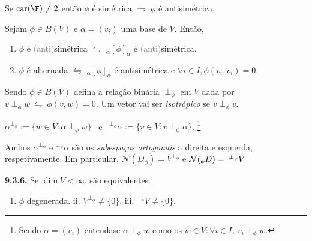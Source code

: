 \begin{note}
    Se \(\operatorname{car}(\F) \neq 2\) então \(\phi\) é simétrica \(\leftrightharpoons\) \(\phi\) é  antisimétrica. 
\end{note}

\begin{proposition}
    Sejam \(\phi \in B(V)\) e \(\alpha = (v_i)\) uma base de \(V\). Então, 
    \begin{enumerate}[label = (\alph*), left = 0.5cm]
        \item \(\phi \) é \textcolor{gray}{(anti)}simétrica \(\leftrightharpoons\) \(_\alpha [\phi]_\alpha\) é \textcolor{gray}{(anti)}simétrica.
        \item \(\phi \) é alternada \(\leftrightharpoons\) \(_\alpha [\phi]_\alpha\) é antisimétrica e \(\forall i\in I, \phi(v_i,v_i)= 0 \).
    \end{enumerate}
\end{proposition}

\begin{definition}
    Sendo \(\phi \in B(V)\) defina a relação binária \(\perp_\phi\) em \(V\) dada por \(v \perp_\phi w\ \leftrightharpoons \ \phi(v,w)=0\). Um vetor vai ser \emph{isotrópico} se \(v\perp_\phi v \). %
\end{definition}


\begin{definition}
    \centering
    \(\alpha^{\perp_\phi} := \{w \in V:  \alpha \perp_\phi w\}\) \ e \  \(^{\perp_\phi}\alpha := \{v \in V: v \perp_\phi \alpha\}\). \footnote{Sendo \(\alpha = (v_i)\) entendase \(\alpha \perp_\phi w\) como os \(w \in V : \forall i \in I,\ v_i \perp_\phi w\).}
\end{definition}

\begin{note}
    Ambos \(\alpha^{\perp_\phi}\) e \(^{\perp_\phi}\alpha\) são os \emph{subespaços ortogonais} a direita e esquerda, respetivamente. Em particular, \(\mathcal{N}(D_\phi) = V^{\perp_\phi}\) e \(\mathcal{N}(_\phi D) = \hspace{0.1cm}^{\perp_\phi}V\)
\end{note}

\begin{lemma}
    \textbf{9.3.6.} Se \(\dim V < \infty \), são equivalentes: 
    \begin{enumerate}[left = -0.5cm, label= \roman*.]
        \centering
        \item \(\phi \) degenerada. \hspace{1cm} ii. \(V^{\perp_\phi}\neq \{0\}\). \hspace{1cm} iii. \(^{\perp_\phi}V\neq \{0\}\).
    \end{enumerate}
\end{lemma}

